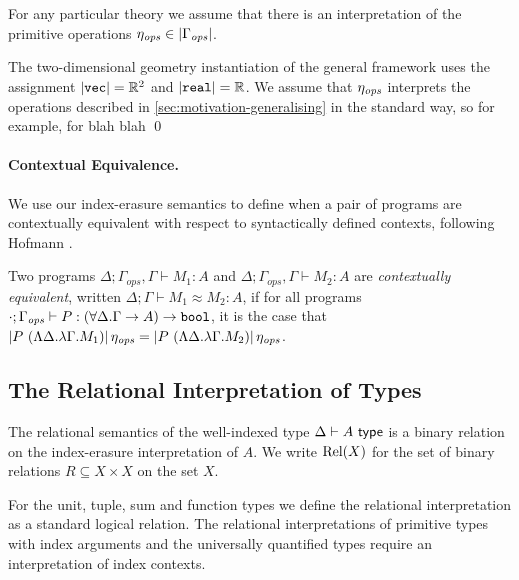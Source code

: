 For any particular theory we assume that there is an
interpretation of the primitive operations $\eta_{\mathit{ops}} \in \left| \Gamma_{\mathit{ops}}\right|$.

\begin{example*}
  The two-dimensional geometry instantiation of the general framework
  uses the assignment $\left| \textup{\texttt{vec}}\right| = \mathbb{R}^2$ and
  $\left| \textup{\texttt{real}}\right| = \mathbb{R}$.
  We assume that $\eta_{\mathit{ops}}$ interprets the operations described in \autoref{sec:motivation-generalising}
  in the standard way, so for example, for  blah blah
\qed
\end{example*}



\paragraph{Contextual Equivalence.}
We use our index-erasure semantics to define when a pair of programs
are contextually equivalent with respect to syntactically defined
contexts, following Hofmann \cite{hofmann08correctness}.

\newcommand{\ctxteq}[5]{{#1};{#2}\vdash{#3}\approx{#4}:{#5}}
\begin{definition}\label{defn:ctxt-equiv}
Two programs $\Delta; \Gamma_{\mathit{ops}}, \Gamma \vdash M_1 : A$
and $\Delta; \Gamma_{\mathit{ops}}, \Gamma \vdash M_2 : A$ are
\emph{contextually equivalent}, written $\ctxteq\Delta\Gamma{M_1}{M_2}A$, if 
  for all
  programs $\cdot;\Gamma_{\mathit{ops}} \vdash P : (\forall \Delta. \Gamma
  \to A) \to \textup{\texttt{bool}}$, it is the case that $\left| P\ (\Lambda
    \Delta. \lambda \Gamma. M_1)\right|\eta_{\mathit{ops}} = \left| P\
    (\Lambda \Delta. \lambda \Gamma. M_2)\right|\eta_{\mathit{ops}}$.
\end{definition}



\subsection{The Relational Interpretation of Types}
\label{sec:relational-semantics}

The relational semantics of the well-indexed type
$\Delta \vdash A \textup{\textsf{ type}}$ is a binary relation on the index-erasure
interpretation of $A$. We write $\mathrm{Rel}(X)$ for the set
of binary relations $R \subseteq X \times X$ on the set $X$.

For the unit, tuple, sum and function types we define the
relational interpretation as a standard logical relation. The
relational interpretations of primitive types with index arguments and
the universally quantified types require an interpretation of index
contexts.

